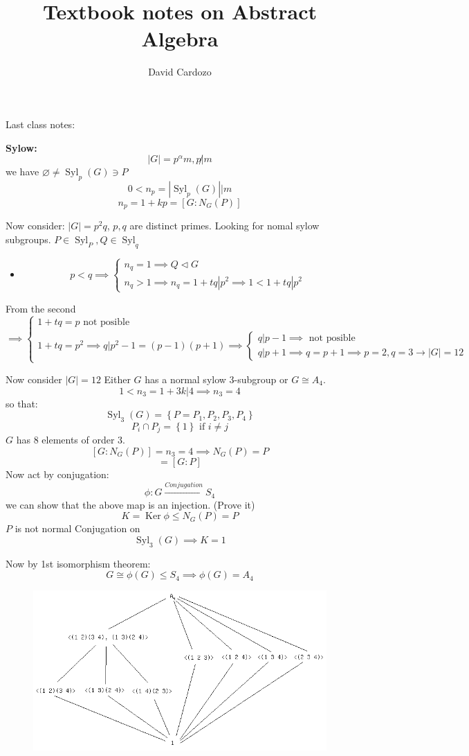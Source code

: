 \documentclass[notitlepage]{article}
\author{David Cardozo}
\title{Textbook notes on Abstract Algebra}
\theoremstyle{definition}
\theoremstyle{remark}
\newcommand{\normal}{\triangleleft}
\begin{document}
	
Last class notes:

\textbf{Sylow:} \[ \left| G \right| = p^{\alpha}m, p \not| m \]
we have $ \varnothing \neq \operatorname{Syl}_p(G) \ni P $
\[ 0 < n_p = \left| \operatorname{Syl}_p(G) \right| | m \]
\[ n_p = 1 +kp = \left[ G : N_G(P) \right] \]

Now consider: $ \left| G \right| = p^2 q $, $ p,q $ are distinct primes.
Looking for nomal sylow subgroups. $ P \in \operatorname{Syl}_P, Q \in \operatorname{Syl}_q $
\begin{itemize}
	\item \[ p < q \implies \begin{cases}
	n_q = 1 \implies Q \normal G \\
	n_q > 1 \implies n_q = 1 + tq | p^2 \implies 1 < 1 +tq | p^2
	\end{cases} \]
\end{itemize}

From the second \[ \implies \begin{cases}
 1 +tq = p \textrm{ not posible } \\
 1+tq = p^2 \implies q | p^2 -1 = (p-1)(p+1) \implies 
 \begin{cases}
 q | p -1 \implies \textrm{ not posible } \\
 q| p+1 \implies q = p +1 \implies p = 2, q =3 \rightarrow \left| G \right| = 12
 \end{cases}
\end{cases} \]

Now consider 
$  \left|G\right| = 12 $ Either $ G $ has a normal sylow 3-subgroup or $ G \cong A_4 $.
\[ 1 < n_3 = 1 + 3k | 4 \implies n_3 = 4 \]
so that:
\[ \operatorname{Syl}_3(G) = \left\lbrace P = P_1, P_2,P_3, P_4 \right\rbrace \]
\[ P_i \cap P_j = \left\lbrace 1 \right\rbrace \textrm{ if } i \neq j \]
$ G $ has $ 8 $ elements of order $ 3 $.
\[ \left[ G : N_G(P) \right] = n_3 = 4 \implies N_G(P) = P \]
\[ = \left[G:P\right] \]
Now act by conjugation:
\[ \phi: G \xrightarrow{Conjugation} S_4 \]
we can show that the above map is an injection. (Prove it)
\[ K = \operatorname{Ker}{\phi} \leq N_G(P) = P \]
$ P $ is not normal
Conjugation on \[ \operatorname{Syl}_3 (G) \implies K = 1 \]

Now by 1st isomorphism theorem:
\[ G \cong \phi(G) \leq S_4 \implies \phi(G) = A_4 \]


\begin{figure}[h!]
\centering
\includegraphics[width=0.8\linewidth]{SubgroupA4}
\caption{}
\label{fig:SubgroupA4}
\end{figure}
\end{document}
